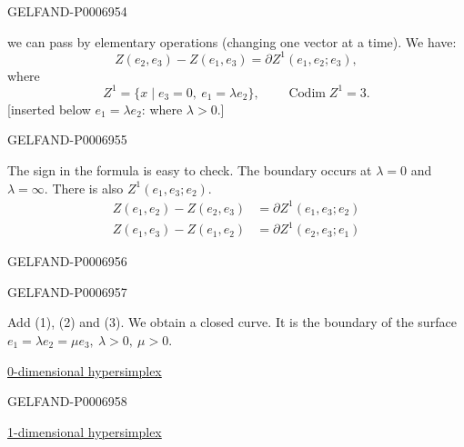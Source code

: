 \begin{GelfandAdjacentEvidence}{GELFAND-P000695}{4}

we can pass by elementary operations (changing one vector at a time).
We have:
\begin{equation}
Z(e_2,e_3)-Z(e_1,e_3)=\partial Z^1(e_1,e_2;e_3),\tag{1}
\end{equation}
where
\[
Z^1=\{x\mid e_3=0,\ e_1=\lambda e_2\},\qquad\operatorname{Codim}Z^1=3.
\]
[inserted below \(e_1=\lambda e_2\): where \(\lambda>0\).]
\end{GelfandAdjacentEvidence}
\begin{GelfandAdjacentEvidence}{GELFAND-P000695}{5}

The sign in the formula is easy to check. The boundary occurs at \(\lambda=0\) and \(\lambda=\infty\).
There is also \(Z^1(e_1,e_3;e_2)\).
\begin{align}
Z(e_1,e_2)-Z(e_2,e_3)&=\partial Z^1(e_1,e_3;e_2)\tag{2}\\
Z(e_1,e_3)-Z(e_1,e_2)&=\partial Z^1(e_2,e_3;e_1)\tag{3}
\end{align}
\end{GelfandAdjacentEvidence}
\begin{GelfandAdjacentEvidence}{GELFAND-P000695}{6}

\end{GelfandAdjacentEvidence}
\begin{GelfandAdjacentEvidence}{GELFAND-P000695}{7}

Add (1), (2) and (3). We obtain a closed curve.
It is the boundary of the surface \(e_1=\lambda e_2=\mu e_3,\ \lambda>0,\ \mu>0\).

\underline{0-dimensional hypersimplex}
\end{GelfandAdjacentEvidence}
\begin{GelfandAdjacentEvidence}{GELFAND-P000695}{8}


\underline{1-dimensional hypersimplex}
\end{GelfandAdjacentEvidence}
